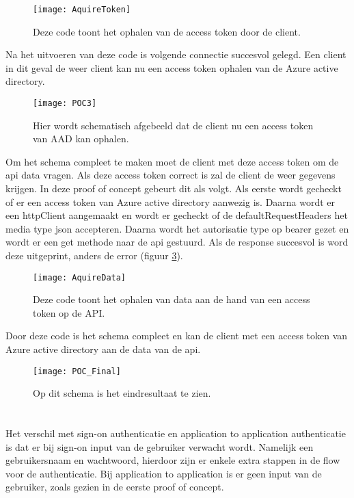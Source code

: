 \begin{figure}[H]
	\centering
	\texttt{[image: AquireToken]} 
	\caption[AuthConfig]{Deze code toont het ophalen van de access token door de client.}
	\label{fig:aquireToken}
\end{figure}\newpage
Na het uitvoeren van deze code is volgende connectie succesvol gelegd. Een client in dit geval de weer client kan nu een access token ophalen van de Azure active directory.
\begin{figure}[H]
	\centering
	\texttt{[image: POC3]} 
	\caption[POC3]{Hier wordt schematisch afgebeeld dat de client nu een access token van AAD kan ophalen.}
	\label{fig:poc3}
\end{figure}
Om het schema compleet te maken moet de client met deze access token om de api data vragen. Als deze access token correct is zal de client de weer gegevens krijgen. In deze proof of concept gebeurt dit als volgt.\newline
Als eerste wordt gecheckt of er een access token van Azure active directory aanwezig is. Daarna wordt er een httpClient aangemaakt en wordt er gecheckt of de defaultRequestHeaders het media type json accepteren. Daarna wordt het autorisatie type op bearer gezet en wordt er een get methode naar de api gestuurd. Als de response succesvol is word deze uitgeprint, anders de error (figuur \ref{fig:aquireData}).
\begin{figure}[H]
	\centering
	\texttt{[image: AquireData]} 
	\caption[AquireData]{Deze code toont het ophalen van data aan de hand van een access token op de API.}
	\label{fig:aquireData}
\end{figure}\newpage
Door deze code is het schema compleet en kan de client met een access token van Azure active directory aan de data van de api.
\begin{figure}[H]
	\centering
	\texttt{[image: POC\_Final]} 
	\caption[POCFinal2]{Op dit schema is het eindresultaat te zien.}
	\label{fig:pocfinal2}
\end{figure}
\section{}
\label{sec:Microsift_signon}
Het verschil met sign-on authenticatie en application to application authenticatie is dat er bij sign-on input van de gebruiker verwacht wordt. Namelijk een gebruikersnaam en wachtwoord, hierdoor zijn er enkele extra stappen in de flow voor de authenticatie. Bij application to application is er geen input van de gebruiker, zoals gezien in de eerste proof of concept.
